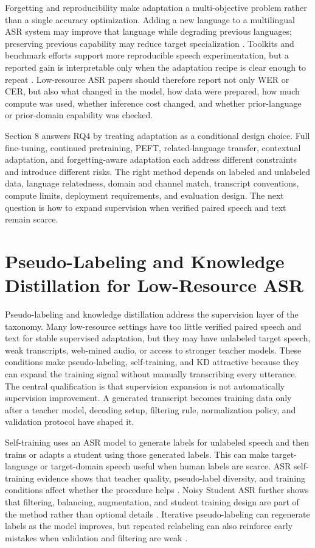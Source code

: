 \documentclass[pdflatex,sn-basic]{sn-jnl}
\theoremstyle{thmstyleone}
\theoremstyle{thmstyletwo}
\theoremstyle{thmstylethree}
\begin{document}
Forgetting and reproducibility make adaptation a multi-objective problem rather than a single accuracy optimization. Adding a new language to a multilingual ASR system may improve that language while degrading previous languages; preserving previous capability may reduce target specialization \citep{qian24_interspeech}. Toolkits and benchmark efforts support more reproducible speech experimentation, but a reported gain is interpretable only when the adaptation recipe is clear enough to repeat \citep{yang2021superb}. Low-resource ASR papers should therefore report not only WER or CER, but also what changed in the model, how data were prepared, how much compute was used, whether inference cost changed, and whether prior-language or prior-domain capability was checked.

Section 8 answers RQ4 by treating adaptation as a conditional design choice. Full fine-tuning, continued pretraining, PEFT, related-language transfer, contextual adaptation, and forgetting-aware adaptation each address different constraints and introduce different risks. The right method depends on labeled and unlabeled data, language relatedness, domain and channel match, transcript conventions, compute limits, deployment requirements, and evaluation design. The next question is how to expand supervision when verified paired speech and text remain scarce.

\section{Pseudo-Labeling and Knowledge Distillation for Low-Resource ASR}

Pseudo-labeling and knowledge distillation address the supervision layer of the taxonomy. Many low-resource settings have too little verified paired speech and text for stable supervised adaptation, but they may have unlabeled target speech, weak transcripts, web-mined audio, or access to stronger teacher models. These conditions make pseudo-labeling, self-training, and KD attractive because they can expand the training signal without manually transcribing every utterance. The central qualification is that supervision expansion is not automatically supervision improvement. A generated transcript becomes training data only after a teacher model, decoding setup, filtering rule, normalization policy, and validation protocol have shaped it.

Self-training uses an ASR model to generate labels for unlabeled speech and then trains or adapts a student using those generated labels. This can make target-language or target-domain speech useful when human labels are scarce. ASR self-training evidence shows that teacher quality, pseudo-label diversity, and training conditions affect whether the procedure helps \citep{kahn2019selftraining}. Noisy Student ASR further shows that filtering, balancing, augmentation, and student training design are part of the method rather than optional details \citep{park20d_interspeech}. Iterative pseudo-labeling can regenerate labels as the model improves, but repeated relabeling can also reinforce early mistakes when validation and filtering are weak \citep{xu2020iterativepseudolabeling,likhomanenko2020slimipl}.
\end{document}
